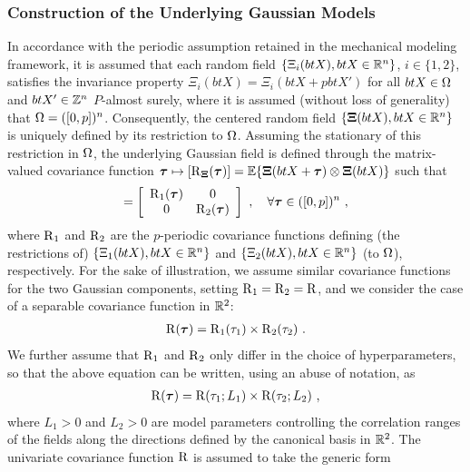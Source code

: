 \subsubsection{Construction of the Underlying Gaussian Models}
\label{section: Chapter4/theory/stochastic/gaussian_model}

In accordance with the periodic assumption retained in the mechanical modeling framework, it is assumed that each random field $\{\Xi_i(btX), btX \in \mathbb{R}^n\}$, $i \in \{1,2\}$, satisfies the invariance property $\Xi_i(btX) = \Xi_i(btX+pbtX')$ for all $btX \in \Omega$ and $btX' \in \mathbb{Z}^n$
$P$-almost surely, where it is assumed (without loss of generality) that $\Omega = ([0,p])^n$. Consequently, the centered random field $\{\boldsymbol{\Xi}(btX), btX \in \mathbb{R}^n\}$ is uniquely defined by its restriction to $\Omega$.  Assuming the stationary of this restriction in $\Omega$, the underlying Gaussian field is defined through the matrix-valued covariance function $\boldsymbol{\tau} \mapsto [\operatorname{R}_{\boldsymbol{\Xi}}(\boldsymbol{\tau})] = \mathbb{E}\{\boldsymbol{\Xi}(btX+\boldsymbol{\tau}) \otimes \boldsymbol{\Xi}(btX)\}$
such that
\begin{align}
  [\cor_{\bs{\Xi}}(\bs{\tau})] = \left[\begin{array}{cc}\cor_1(\bs{\tau}) & 0 \\0 & \cor_2(\bs{\tau}) \end{array}\right]~, \quad \forall \bs{\tau} \in ([0,p])^n~,
\end{align}
where $\operatorname{R}_1$ and $\operatorname{R}_2$ are the $p$-periodic covariance functions defining (the restrictions of) $\{\Xi_1(btX), btX \in \mathbb{R}^n\}$ and $\{\Xi_2(btX), btX \in \mathbb{R}^n\}$ (to $\Omega$), respectively.
For the sake of illustration, we assume similar covariance functions for the two Gaussian components, setting $\operatorname{R}_1 = \operatorname{R}_2 = \operatorname{R}$,
and we consider the case of a separable covariance function in $\mathbb{R}^2$:
\begin{align}
  \operatorname{R}(\boldsymbol{\tau}) = \operatorname{R}_1(\tau_1) \times \operatorname{R}_2(\tau_2)~. \label{eq: composite covariance function}
\end{align}
We further assume that $\operatorname{R}_1$ and $\operatorname{R}_2$ only differ in the choice of hyperparameters, so that the above equation can be written, using an abuse of notation, as
\begin{align}
  \operatorname{R}(\boldsymbol{\tau}) = \operatorname{R}(\tau_1;L_1) \times \operatorname{R}(\tau_2;L_2)~,
\end{align}
where $L_1 > 0$ and $L_2 > 0$ are model parameters controlling the correlation ranges of the fields along the directions defined by the canonical basis in $\mathbb{R}^2$. The univariate covariance function $\operatorname{R}$ is assumed to take the generic form
